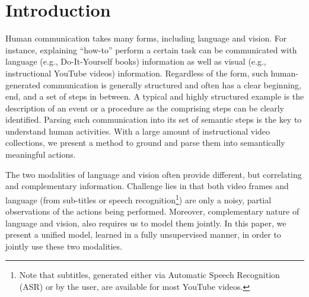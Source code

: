 
\section{Introduction}
Human communication takes many forms, including language and vision. For instance, explaining ``how-to'' perform a certain task can be communicated with language (e.g., Do-It-Yourself books) information as well as visual (e.g., instructional YouTube videos) information. Regardless of the form, such human-generated communication is generally structured and often has a clear beginning, end, and a set of steps in between. A typical and highly structured example is the description of an event or a procedure as the comprising steps can be clearly identified. Parsing such communication into its set of semantic steps is the key to understand human activities. With a large amount of instructional video collections, we present a method to ground and parse them into semantically meaningful actions.



%

The two modalities of language and vision often provide different, but correlating and complementary information. Challenge lies in that both video frames and language (from sub-titles or speech recognition\footnote{Note that subtitles, generated either via Automatic Speech Recognition (ASR) or by the user, are available for most YouTube videos.}) are only a noisy, partial observations of the actions being performed. Moreover, complementary nature of language and vision, also requires us to model them jointly. In this paper, we present a unified model, learned in a fully unsupervised manner, in order to jointly use these two modalities.





